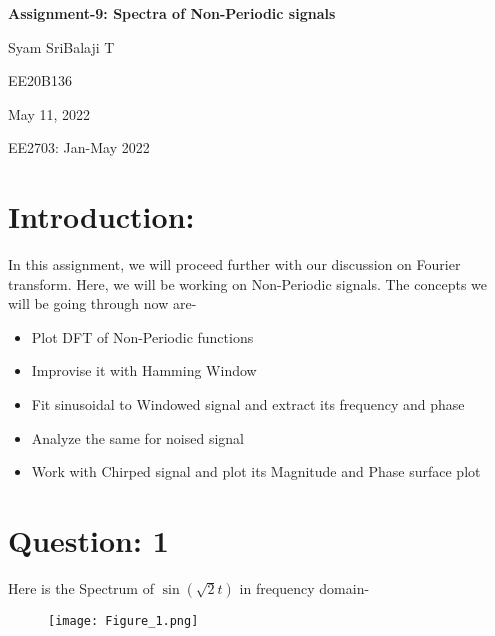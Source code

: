 \documentclass[12pt]{article}
\newcommand\titleofdoc{\LARGE{\textbf{Assignment-9: Spectra of Non-Periodic signals}}}
\begin{document}
\begin{titlepage}
   \begin{center}
        \vspace*{4cm} %

        \Huge{\titleofdoc} 

        \vspace{3 cm}
        \Large{Syam SriBalaji T}
       
        \vspace{0.25cm}
        \large{EE20B136}
       
        \vspace{3 cm}
        \Large{May 11, 2022}
        
        \vspace{0.25 cm}
        \Large{EE2703: Jan-May 2022}
       

       \vfill
    \end{center}
\end{titlepage}

\setcounter{page}{2}
\pagestyle{fancy}
\fancyhf{}
\rhead{\thepage}


\newpage
\section*{Introduction:}
In this assignment, we will proceed further with our discussion on Fourier transform. Here, we will be working on Non-Periodic signals. The concepts we will be going through now are-
\begin{itemize}
  \item Plot DFT of Non-Periodic functions
  \item Improvise it with Hamming Window
  \item Fit sinusoidal to Windowed signal and extract its frequency and phase
  \item Analyze the same for noised signal
  \item Work with Chirped signal and plot its Magnitude and Phase surface plot
\end{itemize}

\section*{Question: 1}
Here is the Spectrum of $\sin(\sqrt{2}t)$ in frequency domain-
\begin{figure}[h!]
\centering
\texttt{[image: Figure\_1.png]}
\label{fig:exemplo}
\end{figure}
\end{document}
